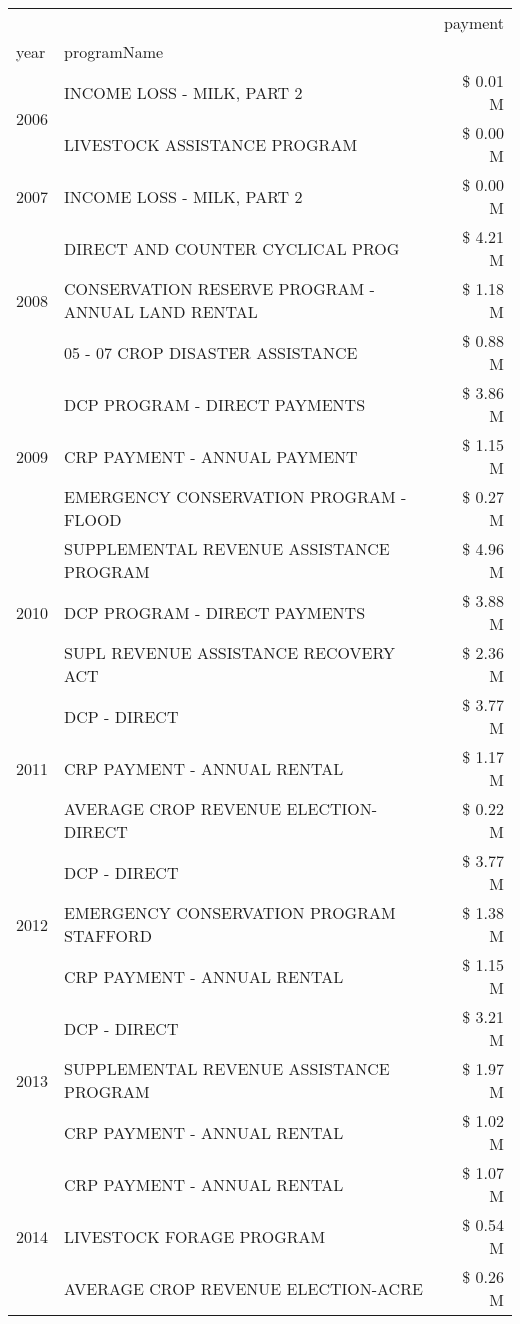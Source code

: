\begin{tabular}{llr}
\toprule
 &  & payment \\
year & programName &  \\
\midrule
\multirow[t]{2}{*}{2006} & INCOME LOSS - MILK, PART 2 & \$ 0.01 M \\
 & LIVESTOCK ASSISTANCE PROGRAM & \$ 0.00 M \\
\cline{1-3}
2007 & INCOME LOSS - MILK, PART 2 & \$ 0.00 M \\
\cline{1-3}
\multirow[t]{3}{*}{2008} & DIRECT AND COUNTER CYCLICAL PROG & \$ 4.21 M \\
 & CONSERVATION RESERVE PROGRAM - ANNUAL LAND RENTAL & \$ 1.18 M \\
 & 05 - 07 CROP DISASTER ASSISTANCE & \$ 0.88 M \\
\cline{1-3}
\multirow[t]{3}{*}{2009} & DCP PROGRAM - DIRECT PAYMENTS & \$ 3.86 M \\
 & CRP PAYMENT - ANNUAL PAYMENT & \$ 1.15 M \\
 & EMERGENCY CONSERVATION PROGRAM - FLOOD & \$ 0.27 M \\
\cline{1-3}
\multirow[t]{3}{*}{2010} & SUPPLEMENTAL REVENUE ASSISTANCE PROGRAM & \$ 4.96 M \\
 & DCP PROGRAM - DIRECT PAYMENTS & \$ 3.88 M \\
 & SUPL REVENUE ASSISTANCE RECOVERY ACT & \$ 2.36 M \\
\cline{1-3}
\multirow[t]{3}{*}{2011} & DCP - DIRECT & \$ 3.77 M \\
 & CRP PAYMENT - ANNUAL RENTAL & \$ 1.17 M \\
 & AVERAGE CROP REVENUE ELECTION-DIRECT & \$ 0.22 M \\
\cline{1-3}
\multirow[t]{3}{*}{2012} & DCP - DIRECT & \$ 3.77 M \\
 & EMERGENCY CONSERVATION PROGRAM STAFFORD & \$ 1.38 M \\
 & CRP PAYMENT - ANNUAL RENTAL & \$ 1.15 M \\
\cline{1-3}
\multirow[t]{3}{*}{2013} & DCP - DIRECT & \$ 3.21 M \\
 & SUPPLEMENTAL REVENUE ASSISTANCE PROGRAM & \$ 1.97 M \\
 & CRP PAYMENT - ANNUAL RENTAL & \$ 1.02 M \\
\cline{1-3}
\multirow[t]{3}{*}{2014} & CRP PAYMENT - ANNUAL RENTAL & \$ 1.07 M \\
 & LIVESTOCK FORAGE PROGRAM & \$ 0.54 M \\
 & AVERAGE CROP REVENUE ELECTION-ACRE & \$ 0.26 M \\

\end{tabular}
